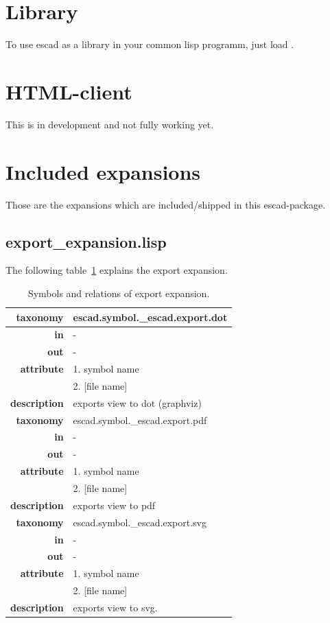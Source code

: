 \documentclass[a4paper, 12pt, openany]{scrbook}
\begin{document}
\section{Library}
To use escad as a library in your common lisp programm, just load .
\section{HTML-client}
This is in development and not fully working yet.
\section{Included expansions}
Those are the expansions which are included/shipped in this escad-package.
\subsection{export\_expansion.lisp}
The following table~\ref{tab:exp-export-expansion} explains the export expansion.
\newcommand{\tabitem}{~~\llap{\textbullet}~~}
\begin{table}[htbp]
\centering
\begin{tabular}{r|p{11cm}}
  \textbf{taxonomy} & \colorbox{black!20}{escad.symbol.\_escad.export.dot} \\
  \hline
  \textbf{in} & - \\
  \hline
  \textbf{out} & - \\
  \hline
  \textbf{attribute} & 1. symbol name \\
                     & 2. [file name] \\
  \hline
  \textbf{description} & exports view to dot (graphviz) \\
  \hline
  \hline
  \textbf{taxonomy} & \colorbox{black!20}{escad.symbol.\_escad.export.pdf} \\
  \hline
  \textbf{in} & - \\
  \hline
  \textbf{out} & - \\
  \hline
  \textbf{attribute} & 1. symbol name \\
                     & 2. [file name] \\
  \hline
  \textbf{description} & exports view to pdf \\
  \hline
  \hline
  \textbf{taxonomy} & \colorbox{black!20}{escad.symbol.\_escad.export.svg} \\
  \hline
  \textbf{in} & - \\
  \hline
  \textbf{out} & - \\
  \hline
  \textbf{attribute} & 1. symbol name \\
                     & 2. [file name] \\
  \hline
  \textbf{description} & exports view to svg. \\
\end{tabular}
\caption{Symbols and relations of export expansion.}
\label{tab:exp-export-expansion}
\end{table}
\end{document}
